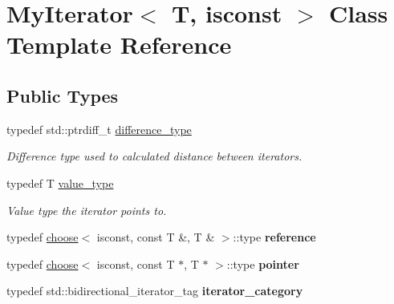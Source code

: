 \hypertarget{classMyIterator}{}\section{My\+Iterator$<$ T, isconst $>$ Class Template Reference}
\label{classMyIterator}
\subsection*{Public Types}
\begin{DoxyCompactItemize}
\item 
\mbox{\label{classMyIterator_ad6844a285132dae3746eab56209a19df}} 
typedef std\+::ptrdiff\+\_\+t \hyperlink{classMyIterator_ad6844a285132dae3746eab56209a19df}{difference\+\_\+type}
\begin{DoxyCompactList}\small\item\em Difference type used to calculated distance between iterators. \end{DoxyCompactList}\item 
\mbox{\label{classMyIterator_a6ea9b266b66cd308b900699e00f863db}} 
typedef T \hyperlink{classMyIterator_a6ea9b266b66cd308b900699e00f863db}{value\+\_\+type}
\begin{DoxyCompactList}\small\item\em Value type the iterator points to. \end{DoxyCompactList}\item 
\mbox{\label{classMyIterator_a8c0763dcd90e1c27433646a7b8f7131c}} 
typedef \hyperlink{structchoose}{choose}$<$ isconst, const T \&, T \& $>$\+::type {\bfseries reference}
\item 
\mbox{\label{classMyIterator_a0d485c5bfcae69cea8bf5e264568669c}} 
typedef \hyperlink{structchoose}{choose}$<$ isconst, const T $\ast$, T $\ast$ $>$\+::type {\bfseries pointer}
\item 
\mbox{\label{classMyIterator_a340086eda5faa8e190199c02c49d0ce7}} 
typedef std\+::bidirectional\+\_\+iterator\+\_\+tag {\bfseries iterator\+\_\+category}
\end{DoxyCompactItemize}
